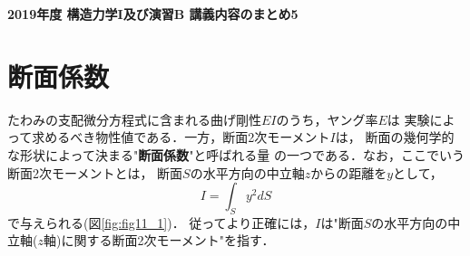 \documentclass[10pt,a4j]{jarticle}
\newlength{\minitwocolumn}
\begin{document}
\newcommand{\fat}[1]{\mbox{\boldmath $#1$}}
\newcommand{\D}{\partial}
\newcommand{\w}{\omega}
\newcommand{\ga}{\alpha}
\newcommand{\gb}{\beta}
\newcommand{\gx}{\xi}
\newcommand{\gz}{\zeta}
\newcommand{\vhat}[1]{\hat{\fat{#1}}}
\newcommand{\spc}{\vspace{0.7\baselineskip}}
\newcommand{\halfspc}{\vspace{0.3\baselineskip}}

\newcommand{\twofig}[2]
 {
   \begin{figure}
     \begin{minipage}[t]{\minitwocolumn}
         \begin{center}   #1
         \end{center}
     \end{minipage}
         \hspace{\columnsep}
     \begin{minipage}[t]{\minitwocolumn}
         \begin{center} #2
         \end{center}
     \end{minipage}
   \end{figure}
 }
\begin{center}
	{\Large \bf 2019年度 構造力学I及び演習B 講義内容のまとめ5} \\
\end{center}
\section{断面係数}
たわみの支配微分方程式に含まれる曲げ剛性$EI$のうち，ヤング率$E$は
実験によって求めるべき物性値である．一方，断面2次モーメント$I$は，
断面の幾何学的な形状によって決まる"{\bf 断面係数}"と呼ばれる量
の一つである．なお，ここでいう断面2次モーメントとは，
断面$S$の水平方向の中立軸$z$からの距離を$y$として，
\begin{equation}
	I=\int_S y^2 dS
	\label{eqn:Iz_xy}
\end{equation}
で与えられる(図\ref{fig:fig11_1})．
従ってより正確には，$I$は"断面$S$の水平方向の中立軸($z$軸)に関する断面2次モーメント"を指す．
\end{document}
